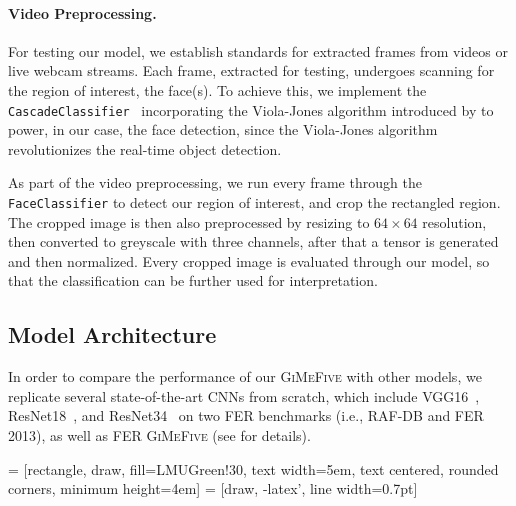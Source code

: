 \paragraph{Video Preprocessing.}
For testing our model, we establish standards for extracted frames from videos or live webcam streams. 
Each frame, extracted for testing, undergoes scanning for the region of interest, the face(s). 
To achieve this, 
we implement the \texttt{CascadeClassifier}~\cite{casc_class} incorporating the Viola-Jones algorithm introduced by \citet{990517} to power, 
in our case, the face detection, 
since the Viola-Jones algorithm revolutionizes the real-time object detection. 

As part of the video preprocessing, 
we run every frame through the \texttt{FaceClassifier} to detect our region of interest, 
and crop the rectangled region. 
The cropped image is then also preprocessed by resizing to $64 \times 64$ resolution, 
then converted to greyscale with three channels, 
after that a tensor is generated and then normalized. 
Every cropped image is evaluated through our model, so that the classification can be further used for interpretation. 

\subsection{Model Architecture}
\label{sec:setup:model}

In order to compare the performance of our \textsc{GiMeFive} with other models, 
we replicate several state-of-the-art CNNs from scratch, 
which include VGG16~\cite{SimonyanZ14a}, 
ResNet18~\cite{HeZRS16}, and ResNet34~\cite{HeZRS16} on two FER benchmarks (i.e., RAF-DB and FER 2013), 
as well as FER \textsc{GiMeFive} (see  for details). 

 = [rectangle, draw, fill=LMUGreen!30, text width=5em, text centered, rounded corners, minimum height=4em]
 = [draw, -latex', line width=0.7pt]

